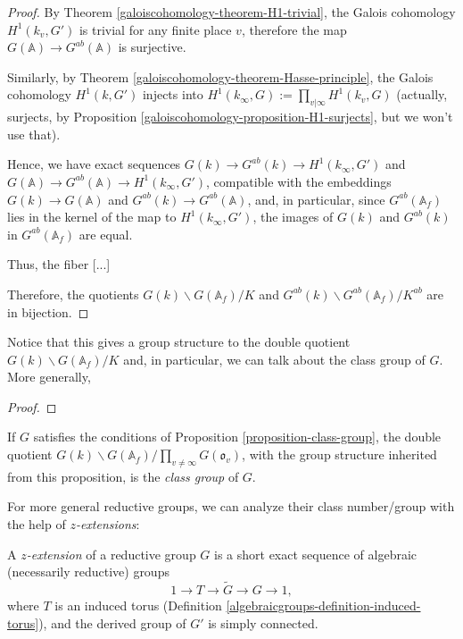 \begin{proof}
 By Theorem \ref{galoiscohomology-theorem-H1-trivial}, the Galois cohomology $H^1(k_v, G')$ is trivial for any finite place $v$, therefore the map $G(\mathbb A)\to G^{ab}(\mathbb A)$ is surjective. 
 
 Similarly, by Theorem \ref{galoiscohomology-theorem-Hasse-principle}, the Galois cohomology $H^1(k, G')$ injects into $H^1(k_\infty, G) := \prod_{v|\infty} H^1(k_v, G)$ (actually, surjects, by Proposition \ref{galoiscohomology-proposition-H1-surjects}, but we won't use that).
 
 Hence, we have exact sequences $G(k)\to G^{ab}(k) \to H^1(k_\infty, G')$ and $G(\mathbb A)\to G^{ab}(\mathbb A) \to H^1(k_\infty,G')$, compatible with the embeddings $G(k)\to G(\mathbb A)$ and $G^{ab}(k)\to G^{ab}(\mathbb A)$, and, in particular, since $G^{ab}(\mathbb A_f)$ lies in the kernel of the map to $H^1(k_\infty, G')$, the images of $G(k)$ and $G^{ab}(k)$ in $G^{ab}(\mathbb A_f)$ are equal. 
 
 Thus, the fiber [...]
 
 Therefore, the quotients $G(k)\backslash G(\mathbb A_f)/K$ and $G^{ab}(k)\backslash G^{ab}(\mathbb A_f)/K^{ab}$ are in bijection.
\end{proof}

Notice that this gives a group structure to the double quotient $G(k)\backslash G(\mathbb A_f)/K$ and, in particular, we can talk about the class group of $G$. More generally, 

\begin{proposition}
 \label{proposition-class-group}
 \cite[Proposition 8.8]{Platonov-Rapinchuk}
\end{proposition}

\begin{proof}
 
\end{proof}


\begin{definition}
 \label{definition-class-group}
If $G$ satisfies the conditions of Proposition \ref{proposition-class-group}, the double quotient $G(k)\backslash G(\mathbb A_f)/\prod_{v\ne \infty} G(\mathfrak o_v)$, with the group structure inherited from this proposition, is the {\it class group} of $G$. 
\end{definition}

For more general reductive groups, we can analyze their class number/group with the help of \emph{$z$-extensions}:

\begin{definition}
 \label{definition-z-extention}
A {\it $z$-extension} of a reductive group $G$ is a short exact sequence of algebraic (necessarily reductive) groups
$$ 1\to T\to \tilde G\to G\to 1,$$
where $T$ is an induced torus (Definition \ref{algebraicgroups-definition-induced-torus}), and the derived group of $G'$ is simply connected.
\end{definition}


